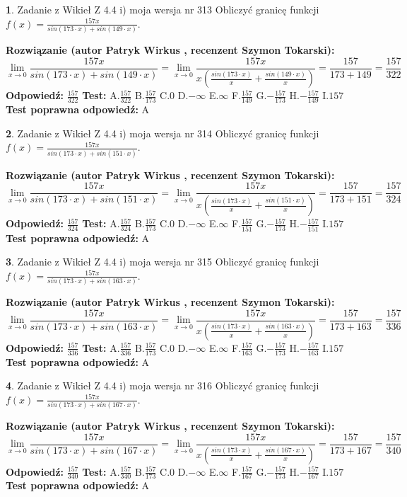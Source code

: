 \documentclass[12pt, a4paper]{article}
\theoremstyle{definition} %
\newtheorem{zad}{}
\newcommand{\zadStart}[1]{\begin{zad}#1\newline}
\newcommand{\zadStop}{\end{zad}}
\newcommand{\rozwStart}[2]{\noindent \textbf{Rozwiązanie (autor #1 , recenzent #2): }\newline}
\newcommand{\rozwStop}{\newline}
\newcommand{\odpStart}{\noindent \textbf{Odpowiedź:}\newline}
\newcommand{\odpStop}{\newline}
\newcommand{\testStart}{\noindent \textbf{Test:}\newline}
\newcommand{\testStop}{\newline}
\newcommand{\kluczStart}{\noindent \textbf{Test poprawna odpowiedź:}\newline}
\newcommand{\kluczStop}{\newline}
\begin{document}
\zadStart{Zadanie z Wikieł Z 4.4 i) moja wersja nr 313}
Obliczyć granicę funkcji $f(x)=\frac{157x}{sin(173\cdot x) +sin(149\cdot x)}$.
\zadStop
\rozwStart{Patryk Wirkus}{Szymon Tokarski}
$$\lim\limits_{x\to 0}\frac{157x}{sin(173\cdot x) +sin(149\cdot x)}=\lim\limits_{x\to 0}\frac{157x}{x(\frac{sin(173\cdot x)}{x}+\frac{sin(149\cdot x)}{x})}=\frac{157}{173+149} = \frac{157}{322}$$
\rozwStop
\odpStart
$\frac{157}{322}$
\odpStop
\testStart
A.$\frac{157}{322}$
B.$\frac{157}{173}$
C.$0$
D.$-\infty$
E.$\infty$
F.$\frac{157}{149}$
G.$-\frac{157}{173}$
H.$-\frac{157}{149}$
I.$157$
\testStop
\kluczStart
A
\kluczStop



\zadStart{Zadanie z Wikieł Z 4.4 i) moja wersja nr 314}
Obliczyć granicę funkcji $f(x)=\frac{157x}{sin(173\cdot x) +sin(151\cdot x)}$.
\zadStop
\rozwStart{Patryk Wirkus}{Szymon Tokarski}
$$\lim\limits_{x\to 0}\frac{157x}{sin(173\cdot x) +sin(151\cdot x)}=\lim\limits_{x\to 0}\frac{157x}{x(\frac{sin(173\cdot x)}{x}+\frac{sin(151\cdot x)}{x})}=\frac{157}{173+151} = \frac{157}{324}$$
\rozwStop
\odpStart
$\frac{157}{324}$
\odpStop
\testStart
A.$\frac{157}{324}$
B.$\frac{157}{173}$
C.$0$
D.$-\infty$
E.$\infty$
F.$\frac{157}{151}$
G.$-\frac{157}{173}$
H.$-\frac{157}{151}$
I.$157$
\testStop
\kluczStart
A
\kluczStop



\zadStart{Zadanie z Wikieł Z 4.4 i) moja wersja nr 315}
Obliczyć granicę funkcji $f(x)=\frac{157x}{sin(173\cdot x) +sin(163\cdot x)}$.
\zadStop
\rozwStart{Patryk Wirkus}{Szymon Tokarski}
$$\lim\limits_{x\to 0}\frac{157x}{sin(173\cdot x) +sin(163\cdot x)}=\lim\limits_{x\to 0}\frac{157x}{x(\frac{sin(173\cdot x)}{x}+\frac{sin(163\cdot x)}{x})}=\frac{157}{173+163} = \frac{157}{336}$$
\rozwStop
\odpStart
$\frac{157}{336}$
\odpStop
\testStart
A.$\frac{157}{336}$
B.$\frac{157}{173}$
C.$0$
D.$-\infty$
E.$\infty$
F.$\frac{157}{163}$
G.$-\frac{157}{173}$
H.$-\frac{157}{163}$
I.$157$
\testStop
\kluczStart
A
\kluczStop



\zadStart{Zadanie z Wikieł Z 4.4 i) moja wersja nr 316}
Obliczyć granicę funkcji $f(x)=\frac{157x}{sin(173\cdot x) +sin(167\cdot x)}$.
\zadStop
\rozwStart{Patryk Wirkus}{Szymon Tokarski}
$$\lim\limits_{x\to 0}\frac{157x}{sin(173\cdot x) +sin(167\cdot x)}=\lim\limits_{x\to 0}\frac{157x}{x(\frac{sin(173\cdot x)}{x}+\frac{sin(167\cdot x)}{x})}=\frac{157}{173+167} = \frac{157}{340}$$
\rozwStop
\odpStart
$\frac{157}{340}$
\odpStop
\testStart
A.$\frac{157}{340}$
B.$\frac{157}{173}$
C.$0$
D.$-\infty$
E.$\infty$
F.$\frac{157}{167}$
G.$-\frac{157}{173}$
H.$-\frac{157}{167}$
I.$157$
\testStop
\kluczStart
A
\kluczStop
\end{document}

